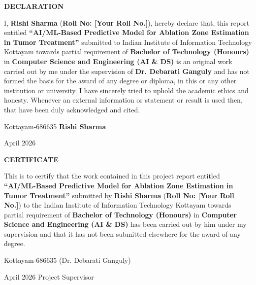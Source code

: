 \documentclass[12pt,a4wide]{report}
\theoremstyle{plain}
\theoremstyle{definition}
\theoremstyle{remark}
\begin{document}
\clearpage
 \setcounter{page}{2}
\begin{center}
{\large{\bf{DECLARATION}}}
\end{center}


\noindent I, \textbf{Rishi Sharma} (\textbf{Roll No: [Your Roll No.]}), hereby declare that, this report entitled
\textbf{``AI/ML-Based Predictive Model for Ablation Zone Estimation in Tumor Treatment''} submitted to Indian
Institute of Information Technology Kottayam towards partial
requirement of {\bf Bachelor of Technology (Honours)} in \textbf{Computer Science and Engineering (AI \& DS)}
is an original work carried out by me under the supervision of
\textbf{Dr. Debarati Ganguly} and has not formed the basis for the award
of any degree or diploma, in this or any other institution or
university. I have sincerely tried to uphold the academic ethics
and honesty. Whenever an external information or statement or
result is used then, that have been duly acknowledged and cited.

\vspace{4cm}

\noindent Kottayam-686635 \hfill \textbf{Rishi Sharma}

\noindent April  2026

\clearpage


 \setcounter{page}{3}
\begin{center}
{\large{\bf{CERTIFICATE}}}
\end{center}


\noindent This is to certify that the work contained in this
project report entitled \textbf{``AI/ML-Based Predictive Model for Ablation Zone Estimation in Tumor Treatment''}
submitted by \textbf{Rishi Sharma} (\textbf{Roll No: [Your Roll No.]}) to the Indian Institute of Information Technology Kottayam
towards partial requirement of {\bf Bachelor of Technology (Honours)} in
\textbf{Computer Science and Engineering (AI \& DS)} has been carried out by him under my
supervision and that it has not been submitted elsewhere for the
award of any degree.


\vspace{4cm}

\noindent Kottayam-686635  \hfill (Dr. Debarati Ganguly)

\noindent April  2026 \hfill Project Supervisor
\end{document}
